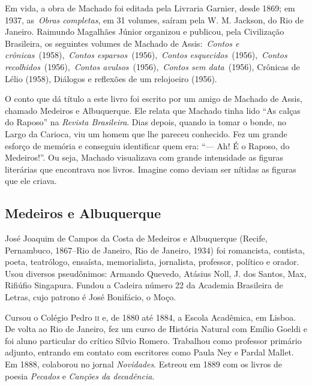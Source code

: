 Em vida, a obra de Machado foi editada pela Livraria Garnier, desde
1869; em 1937, as~\emph{Obras completas}, em 31 volumes, saíram pela W.
M. Jackson, do Rio de Janeiro. Raimundo Magalhães Júnior organizou e
publicou, pela Civilização Brasileira, os seguintes volumes de Machado
de Assis:~\emph{Contos e crônicas}~(1958),~\emph{Contos
esparsos}~(1956),~\emph{Contos esquecidos}~(1956),~\emph{Contos
recolhidos}~(1956),~\emph{Contos avulsos}~(1956),~\emph{Contos sem
data}~(1956), Crônicas de Lélio (1958), Diálogos e reflexões de um
relojoeiro (1956).~

O conto que dá título a este livro foi escrito por um amigo de Machado
de Assis, chamado Medeiros e Albuquerque. Ele relata que
Machado tinha lido ``As calças do Raposo'' na \emph{Revista
Brasileira}. Dias depois, quando ia tomar o bonde, no Largo da Carioca,
viu um homem que lhe pareceu conhecido. Fez um grande esforço de memória
e conseguiu identificar quem era: ``--- Ah! É o Raposo, do Medeiros!''.
Ou seja, Machado visualizava com grande intensidade as figuras
literárias que encontrava nos livros. Imagine como deviam ser nítidas as
figuras que ele criava.

\subsection{Medeiros e Albuquerque}

José Joaquim de Campos da Costa de Medeiros e Albuquerque (Recife, Pernambuco, 1867--Rio de Janeiro, Rio de Janeiro, 1934) foi
romancista, contista, poeta, teatrólogo, ensaísta, memorialista,
jornalista, professor, político e orador. Usou diversos pseudônimos:
Armando Quevedo, Atásius Noll, J. dos Santos, Max, Rifiúfio Singapura.
Fundou a Cadeira número 22 da Academia Brasileira de Letras, cujo
patrono é José Bonifácio, o Moço.

Cursou o Colégio Pedro \textsc{ii} e, de 1880 até 1884, a Escola Acadêmica, em
Lisboa. De volta ao Rio de Janeiro, fez um curso de História Natural com
Emílio Goeldi e foi aluno particular do crítico Sílvio Romero. Trabalhou
como professor primário adjunto, entrando em contato com escritores como
Paula Ney e Pardal Mallet. Em 1888, colaborou no jornal
\emph{Novidades}. Estreou em 1889 com os livros de poesia \emph{Pecados}
e \emph{Canções da decadência}.

